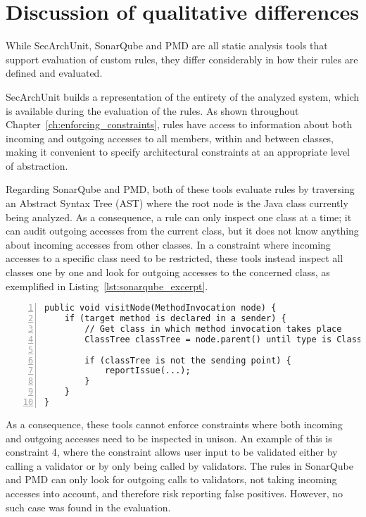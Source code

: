 \section{Discussion of qualitative differences}
While SecArchUnit, SonarQube and PMD are all static analysis tools that support evaluation of custom rules, they differ considerably in how their rules are defined and evaluated.

SecArchUnit builds a representation of the entirety of the analyzed system, which is available during the evaluation of the rules. As shown throughout Chapter~\ref{ch:enforcing_constraints}, rules have access to information about both incoming and outgoing accesses to all members, within and between classes, making it convenient to specify architectural constraints at an appropriate level of abstraction.

Regarding SonarQube and PMD, both of these tools evaluate rules by traversing an Abstract Syntax Tree (AST) where the root node is the Java class currently being analyzed. As a consequence, a rule can only inspect one class at a time; it can audit outgoing accesses from the current class, but it does not know anything about incoming accesses from other classes. In a constraint where incoming accesses to a specific class need to be restricted, these tools instead inspect all classes one by one and look for outgoing accesses to the concerned class, as exemplified in Listing~\ref{lst:sonarqube_excerpt}. 

\begin{lstlisting}[caption={Excerpt of constraint 3 in SonarQube, simplified using pseudo code. See full rule definition in Appendix~\ref{apx:sonarqube} and the related PMD rule in Appendix~\ref{apx:pmd}.}, captionpos=b, label=lst:sonarqube_excerpt, numbers=left, showstringspaces=false]
public void visitNode(MethodInvocation node) {
    if (target method is declared in a sender) {
        // Get class in which method invocation takes place
        ClassTree classTree = node.parent() until type is ClassTree

        if (classTree is not the sending point) {
            reportIssue(...);
        }
    }
}
\end{lstlisting}

As a consequence, these tools cannot enforce constraints where both incoming and outgoing accesses need to be inspected in unison. An example of this is constraint 4, where the constraint allows user input to be validated either by calling a validator or by only being called by validators. The rules in SonarQube and PMD can only look for outgoing calls to validators, not taking incoming accesses into account, and therefore risk reporting false positives. However, no such case was found in the evaluation.


